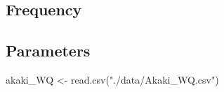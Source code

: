 \documentclass[
]{book}
\newenvironment{Shaded}{\begin{snugshade}}{\end{snugshade}}
\newcommand{\FunctionTok}[1]{\textcolor[rgb]{0.00,0.00,0.00}{#1}}
\newcommand{\NormalTok}[1]{#1}
\newcommand{\OtherTok}[1]{\textcolor[rgb]{0.56,0.35,0.01}{#1}}
\newcommand{\StringTok}[1]{\textcolor[rgb]{0.31,0.60,0.02}{#1}}
\begin{document}
\hypertarget{frequency-1}{%
\subsection{Frequency}\label{frequency-1}}

\hypertarget{parameters-1}{%
\subsection{Parameters}\label{parameters-1}}

\begin{Shaded}
\begin{Highlighting}[]
\NormalTok{akaki\_WQ }\OtherTok{\textless{}{-}} \FunctionTok{read.csv}\NormalTok{(}\StringTok{"./data/Akaki\_WQ.csv"}\NormalTok{)}
\end{Highlighting}
\end{Shaded}

\citet{Kassegne2019}

  
\end{document}
